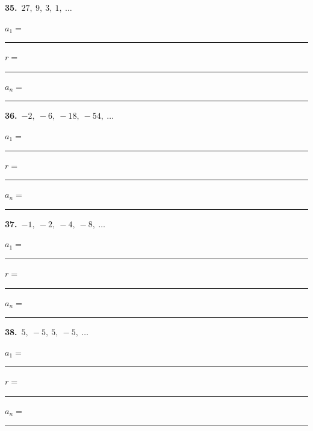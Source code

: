 \documentclass[11pt,letterpaper]{article}
\begin{document}
\needspace{2.0cm}\par\vspace{3mm}\noindent\begin{minipage}[t]{0.48\linewidth}{\color{fmturn}\bfseries 35.}\ $27,\ 9,\ 3,\ 1,\ \ldots$\par\vspace{2mm}\hspace*{4mm}$a_1=$\,\rule{1.2cm}{0.4pt}\quad $r=$\,\rule{1.2cm}{0.4pt}\par\vspace{2.5mm}\hspace*{4mm}$a_n=$\,\rule{3.6cm}{0.4pt}\end{minipage}\hfill\begin{minipage}[t]{0.48\linewidth}{\color{fmturn}\bfseries 36.}\ $-2,\ -6,\ -18,\ -54,\ \ldots$\par\vspace{2mm}\hspace*{4mm}$a_1=$\,\rule{1.2cm}{0.4pt}\quad $r=$\,\rule{1.2cm}{0.4pt}\par\vspace{2.5mm}\hspace*{4mm}$a_n=$\,\rule{3.6cm}{0.4pt}\end{minipage}\par\vspace{1.0cm}
\needspace{2.0cm}\par\vspace{3mm}\noindent\begin{minipage}[t]{0.48\linewidth}{\color{fmturn}\bfseries 37.}\ $-1,\ -2,\ -4,\ -8,\ \ldots$\par\vspace{2mm}\hspace*{4mm}$a_1=$\,\rule{1.2cm}{0.4pt}\quad $r=$\,\rule{1.2cm}{0.4pt}\par\vspace{2.5mm}\hspace*{4mm}$a_n=$\,\rule{3.6cm}{0.4pt}\end{minipage}\hfill\begin{minipage}[t]{0.48\linewidth}{\color{fmturn}\bfseries 38.}\ $5,\ -5,\ 5,\ -5,\ \ldots$\par\vspace{2mm}\hspace*{4mm}$a_1=$\,\rule{1.2cm}{0.4pt}\quad $r=$\,\rule{1.2cm}{0.4pt}\par\vspace{2.5mm}\hspace*{4mm}$a_n=$\,\rule{3.6cm}{0.4pt}\end{minipage}\par\vspace{1.0cm}
\end{document}
